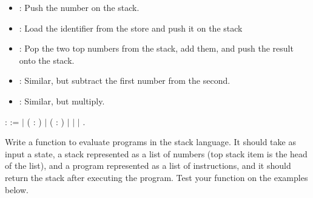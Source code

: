 \documentclass[12pt]{report}
\begin{document}
\begin{itemize}
\item  {} : Push the number  on the stack.

\item  {} : Load the identifier  from the store and push it
                  on the stack

\item  {}:   Pop the two top numbers from the stack, add them, and
                  push the result onto the stack.

\item  {}:  Similar, but subtract the first number from the second.

\item  {}:   Similar, but multiply. 

\end{itemize}
\begin{coqdoccode}
\coqdocemptyline
\coqdocnoindent
{}  :  :=\coqdoceol
\coqdocnoindent
\ensuremath{|}  ( : )\coqdoceol
\coqdocnoindent
\ensuremath{|}  ( : )\coqdoceol
\coqdocnoindent
\ensuremath{|} \coqdoceol
\coqdocnoindent
\ensuremath{|} \coqdoceol
\coqdocnoindent
\ensuremath{|} .\coqdoceol
\coqdocemptyline
\end{coqdoccode}
Write a function to evaluate programs in the stack language. It
    should take as input a state, a stack represented as a list of
    numbers (top stack item is the head of the list), and a program
    represented as a list of instructions, and it should return the
    stack after executing the program.  Test your function on the
    examples below.
\end{document}
